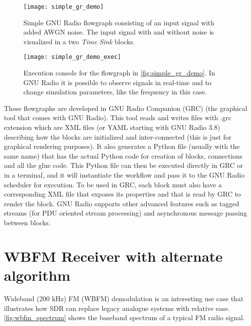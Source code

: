 \begin{figure}[H]
  \centering
  \texttt{[image: simple\_gr\_demo]}
  \caption[Simple GNU Radio flowgraph consisting of an input signal with added AWGN noise]{Simple GNU Radio flowgraph consisting of an input signal with added AWGN noise. The input signal with and without noise is visualized in a two \emph{Time Sink} blocks.}
  \label{fig:simple_gr_demo}
\end{figure}

\begin{figure}[H]
  \centering
  \texttt{[image: simple\_gr\_demo\_exec]}
  \caption[Execution console for the flowgraph in \autoref{fig:simple_gr_demo}]{Execution console for the flowgraph in \autoref{fig:simple_gr_demo}. In GNU Radio it is possible to observe signals in real-time and to change simulation parameters, like the frequency in this case.}
  \label{fig:simple_gr_demo_exec}
\end{figure}

These flowgraphs are developed in GNU Radio Companion (GRC) (the graphical tool that comes with GNU Radio). This tool reads and writes files with .grc extension which are XML files (or YAML starting with GNU Radio 3.8) describing how the blocks are initialized and inter-connected (this is just for graphical rendering purposes). It also generates a Python file (usually with the same name) that has the actual Python code for creation of blocks, connections and all the glue code. This Python file can then be executed directly in GRC or in a terminal, and it will instantiate the workflow and pass it to the GNU Radio scheduler for execution. To be used in GRC, each block must also have a corresponding XML file that exposes its properties and that is read by GRC to render the block.
GNU Radio supports other advanced features such as tagged streams (for PDU oriented stream processing) and asynchronous message passing between blocks.

\section{WBFM Receiver with alternate algorithm}
\label{sect:WBFM_Receiver_with_alternate_algorithm}
Wideband (200 kHz) FM (WBFM) demodulation is an interesting use case that illustrates how SDR can replace legacy analogue systems with relative ease. \autoref{fig:wbfm_spectrum} shows the baseband spectrum of a typical FM radio signal.

